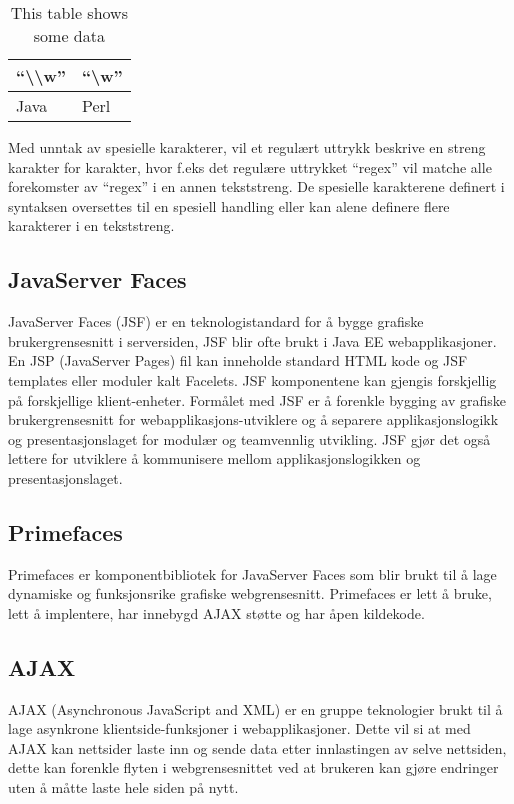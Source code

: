 \documentclass[../main.tex]{subfiles}
\begin{document}
\begin{table}
\begin{center}
\caption{This table shows some data}
  \begin{tabular}{ | p{5cm} | p{5cm} |}
    \hline
    “\textbackslash \textbackslash w” & “\textbackslash w” \\ \hline
    Java & Perl \\
    \hline
  \end{tabular}
\end{center}
\end{table}

Med unntak av spesielle karakterer, vil et regulært uttrykk beskrive en streng karakter for karakter, hvor f.eks det regulære uttrykket “regex” vil matche alle forekomster av “regex” i en annen tekststreng. De spesielle karakterene definert i syntaksen oversettes til en spesiell handling eller kan alene definere flere karakterer i en tekststreng. 

\subsection{JavaServer Faces}
JavaServer Faces (JSF) er en teknologistandard for å bygge grafiske brukergrensesnitt i serversiden, JSF blir ofte brukt i Java EE webapplikasjoner. En JSP (JavaServer Pages) fil kan inneholde standard HTML kode og JSF templates eller moduler kalt Facelets. JSF komponentene kan gjengis forskjellig på forskjellige klient-enheter. Formålet med JSF er å forenkle bygging av grafiske brukergrensesnitt for webapplikasjons-utviklere og å separere applikasjonslogikk og presentasjonslaget for modulær og teamvennlig utvikling. JSF gjør det også lettere for utviklere å kommunisere mellom applikasjonslogikken og presentasjonslaget. 

\subsection{Primefaces}
Primefaces er komponentbibliotek for JavaServer Faces som blir brukt til å lage dynamiske og funksjonsrike grafiske webgrensesnitt. Primefaces er lett å bruke, lett å implentere, har innebygd AJAX støtte og har åpen kildekode.

\subsection{AJAX}
AJAX (Asynchronous JavaScript and XML) er en gruppe teknologier brukt til å lage asynkrone klientside-funksjoner i webapplikasjoner. Dette vil si at med AJAX kan nettsider laste inn og sende data etter innlastingen av selve nettsiden, dette kan forenkle flyten i webgrensesnittet ved at brukeren kan gjøre endringer uten å måtte laste hele siden på nytt. 
\end{document}
